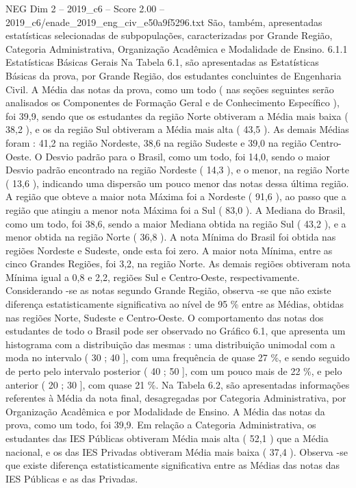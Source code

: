 \begin{textsample}{NEG Dim 2 – 2019\_c6 – Score 2.00 – 2019\_c6/enade\_2019\_eng\_civ\_e50a9f5296.txt}
São, também, apresentadas estatísticas selecionadas de subpopulações, caracterizadas por Grande Região, Categoria Administrativa, Organização Acadêmica e Modalidade de Ensino. 6.1.1 Estatísticas Básicas Gerais Na Tabela 6.1, são apresentadas as Estatísticas Básicas da prova, por Grande Região, dos estudantes concluintes de Engenharia Civil.
A Média das notas da prova, como um todo ( nas seções seguintes serão analisados os Componentes de Formação Geral e de Conhecimento Específico ), foi 39,9, sendo que os estudantes da região Norte obtiveram a Média mais baixa ( 38,2 ), e os da região Sul obtiveram a Média mais alta ( 43,5 ).
As demais Médias foram : 41,2 na região Nordeste, 38,6 na região Sudeste e 39,0 na região Centro-Oeste.
O Desvio padrão para o Brasil, como um todo, foi 14,0, sendo o maior Desvio padrão encontrado na região Nordeste ( 14,3 ), e o menor, na região Norte ( 13,6 ), indicando uma dispersão um pouco menor das notas dessa última região.
A região que obteve a maior nota Máxima foi a Nordeste ( 91,6 ), ao passo que a região que atingiu a menor nota Máxima foi a Sul ( 83,0 ).
A Mediana do Brasil, como um todo, foi 38,6, sendo a maior Mediana obtida na região Sul ( 43,2 ), e a menor obtida na região Norte ( 36,8 ).
A nota Mínima do Brasil foi obtida nas regiões Nordeste e Sudeste, onde esta foi zero.
A maior nota Mínima, entre as cinco Grandes Regiões, foi 3,2, na região Norte.
As demais regiões obtiveram nota Mínima igual a 0,8 e 2,2, regiões Sul e Centro-Oeste, respectivamente.
Considerando -se as notas segundo Grande Região, observa -se que não existe diferença estatisticamente significativa ao nível de 95 \% entre as Médias, obtidas nas regiões Norte, Sudeste e Centro-Oeste.
O comportamento das notas dos estudantes de todo o Brasil pode ser observado no Gráfico 6.1, que apresenta um histograma com a distribuição das mesmas : uma distribuição unimodal com a moda no intervalo ( 30 ; 40 ], com uma frequência de quase 27 \%, e sendo seguido de perto pelo intervalo posterior ( 40 ; 50 ], com um pouco mais de 22 \%, e pelo anterior ( 20 ; 30 ], com quase 21 \%.
Na Tabela 6.2, são apresentadas informações referentes à Média da nota final, desagregadas por Categoria Administrativa, por Organização Acadêmica e por Modalidade de Ensino.
A Média das notas da prova, como um todo, foi 39,9.
Em relação a Categoria Administrativa, os estudantes das IES Públicas obtiveram Média mais alta ( 52,1 ) que a Média nacional, e os das IES Privadas obtiveram Média mais baixa ( 37,4 ).
Observa -se que existe diferença estatisticamente significativa entre as Médias das notas das IES Públicas e as das Privadas.

\end{textsample}
